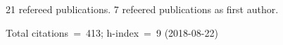 21 refereed publications. 7 refeered publications as first author.

               Total citations~=~413; h-index~=~9 (2018-08-22)